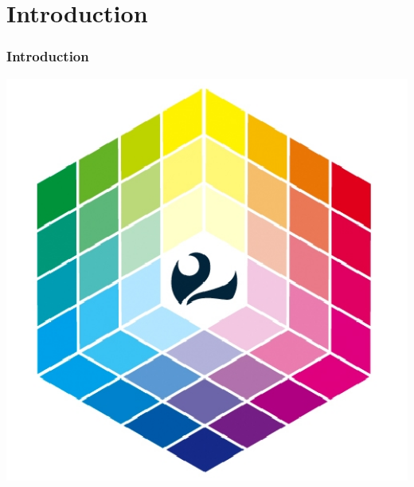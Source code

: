 \section{Introduction}

\begin{frame}
\frametitle{Introduction}

	\begin{center} \includegraphics[scale=0.4]{img/logoUm2.png} \end{center}

\end{frame}


